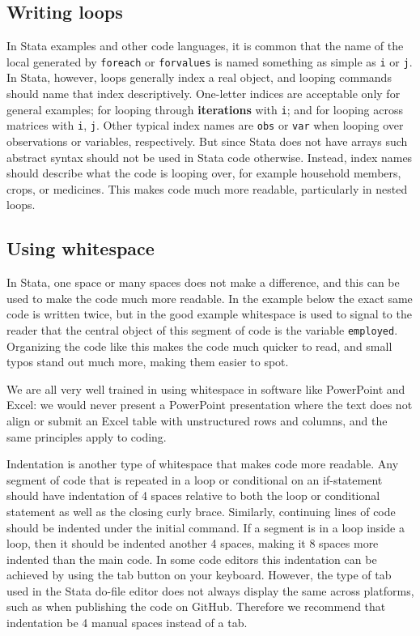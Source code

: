 \subsection{Writing loops}

In Stata examples and other code languages, it is common that the name of the local generated by \texttt{foreach} or \texttt{forvalues}
is named something as simple as \texttt{i} or \texttt{j}. In Stata, however,
loops generally index a real object, and looping commands should name that index descriptively.
One-letter indices are acceptable only for general examples;
for looping through \textbf{iterations} with \texttt{i};
and for looping across matrices with \texttt{i}, \texttt{j}.
Other typical index names are \texttt{obs} or \texttt{var} when looping over observations or variables, respectively.
But since Stata does not have arrays such abstract syntax should not be used in Stata code otherwise.
Instead, index names should describe what the code is looping over, for example household members, crops, or
medicines. This makes code much more readable, particularly in nested loops.


\subsection{Using whitespace}

In Stata, one space or many spaces does not make a difference, and this can be used to make the code
much more readable. In the example below the exact same code is written twice, but in the good example whitespace
is used to signal to the reader that the central object of this segment of code is the variable
\texttt{employed}. Organizing the code like this makes the code much quicker to read, and small typos
stand out much more, making them easier to spot.

We are all very well trained in using whitespace in software like PowerPoint and Excel: we would never
present a PowerPoint presentation where the text does not align or submit an Excel table with unstructured
rows and columns, and the same principles apply to coding.


Indentation is another type of whitespace that makes code more readable. Any segment of code that is
repeated in a loop or conditional on an if-statement should have indentation of 4 spaces relative
to both the loop or conditional statement as well as the closing curly brace.
Similarly, continuing lines of code should be indented under the initial command.
If a segment is in a loop inside a loop, then it should be indented another 4 spaces, making it 8 spaces more
indented than the main code. In some code editors this indentation can be achieved by using the tab button on
your keyboard. However, the type of tab used in the Stata do-file editor does not always display the same across
platforms, such as when publishing the code on GitHub. Therefore we recommend that indentation be 4 manual spaces
instead of a tab.

